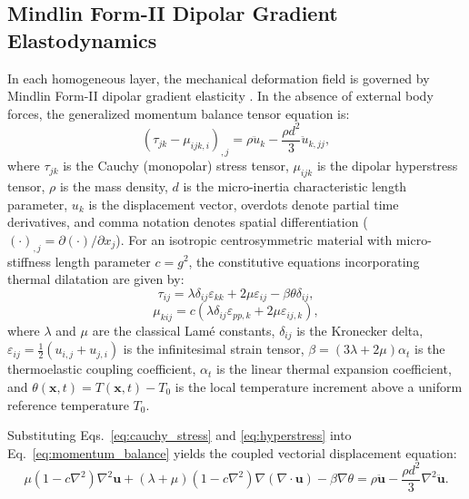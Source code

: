 \documentclass[11pt,a4paper]{article}
\begin{document}
\subsection{Mindlin Form-II Dipolar Gradient Elastodynamics}
In each homogeneous layer, the mechanical deformation field is governed by Mindlin Form-II dipolar gradient elasticity \cite{mindlin1964microstructure,li2016band}. In the absence of external body forces, the generalized momentum balance tensor equation is:
\begin{equation}
\left( \tau_{jk} - \mu_{ijk,i} \right)_{,j} = \rho \ddot{u}_k - \frac{\rho d^2}{3} \ddot{u}_{k,jj},
\label{eq:momentum_balance}
\end{equation}
where $\tau_{jk}$ is the Cauchy (monopolar) stress tensor, $\mu_{ijk}$ is the dipolar hyperstress tensor, $\rho$ is the mass density, $d$ is the micro-inertia characteristic length parameter, $u_k$ is the displacement vector, overdots denote partial time derivatives, and comma notation denotes spatial differentiation ($(\cdot)_{,j} = \partial(\cdot)/\partial x_j$). For an isotropic centrosymmetric material with micro-stiffness length parameter $c = g^2$, the constitutive equations incorporating thermal dilatation are given by:
\begin{equation}
\tau_{ij} = \lambda \delta_{ij} \varepsilon_{kk} + 2\mu \varepsilon_{ij} - \beta \theta \delta_{ij},
\label{eq:cauchy_stress}
\end{equation}
\begin{equation}
\mu_{kij} = c \left( \lambda \delta_{ij} \varepsilon_{pp,k} + 2\mu \varepsilon_{ij,k} \right),
\label{eq:hyperstress}
\end{equation}
where $\lambda$ and $\mu$ are the classical Lam\'e constants, $\delta_{ij}$ is the Kronecker delta, $\varepsilon_{ij} = \frac{1}{2}(u_{i,j} + u_{j,i})$ is the infinitesimal strain tensor, $\beta = (3\lambda + 2\mu)\alpha_t$ is the thermoelastic coupling coefficient, $\alpha_t$ is the linear thermal expansion coefficient, and $\theta(\mathbf{x}, t) = T(\mathbf{x}, t) - T_0$ is the local temperature increment above a uniform reference temperature $T_0$.

Substituting Eqs.~\eqref{eq:cauchy_stress} and \eqref{eq:hyperstress} into Eq.~\eqref{eq:momentum_balance} yields the coupled vectorial displacement equation:
\begin{equation}
\mu (1 - c \nabla^2)\nabla^2 \mathbf{u} + (\lambda + \mu)(1 - c \nabla^2)\nabla(\nabla \cdot \mathbf{u}) - \beta \nabla \theta = \rho \ddot{\mathbf{u}} - \frac{\rho d^2}{3} \nabla^2 \ddot{\mathbf{u}}.
\label{eq:vector_displacement}
\end{equation}
\end{document}
